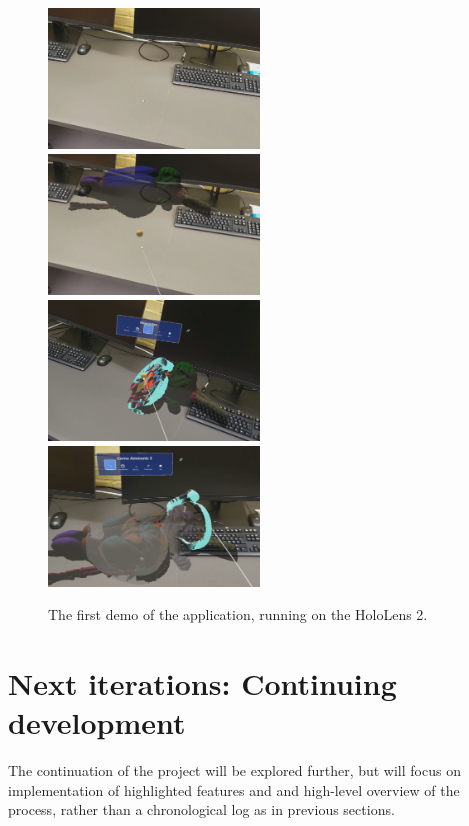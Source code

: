 \begin{figure}[h]
    \includegraphics[width=0.5\textwidth]{fig/mvpdemo1.png}
    \includegraphics[width=0.5\textwidth]{fig/mvpdemo2.png}
    \includegraphics[width=0.5\textwidth]{fig/mvpdemo3.png}
    \includegraphics[width=0.5\textwidth]{fig/mvpdemo4.png}
    \caption{The first demo of the application, running on the HoloLens 2.}
    \label{fig:mvpdemo}
\end{figure}

\section[Iteration N]{Next iterations: Continuing development}

The continuation of the project will be explored further, but will focus on implementation of highlighted features and and high-level overview of the process, rather than a chronological log as in previous sections. 

